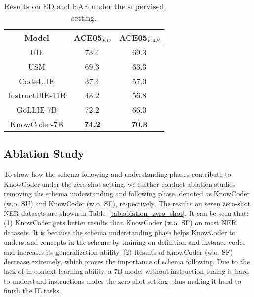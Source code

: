 \begin{table}
  \centering
  \resizebox{0.8\linewidth}{!}
  {
  \begin{tabular}{@{}c|cc}
  \toprule
  \textbf{Model}  & \textbf{ACE05$_{ED}$}         & \textbf{ACE05$_{EAE}$}    \\ 
  
  \midrule
  UIE                     &   73.4    &   69.3   \\
  USM                     &   69.3    &   63.3   \\ 
  \midrule
  Code4UIE                &   37.4    &   57.0   \\ 
  
  \midrule
  
  InstructUIE-11B             &   43.2    &   56.8   \\
  GoLLIE-7B                  &   72.2    &   66.0   \\ 
  
  \midrule
  KnowCoder-7B              &   \textbf{74.2}   &   \textbf{70.3}     \\
  \bottomrule
  \end{tabular}}
  \caption{Results on ED and EAE under the supervised setting.}
  \label{tab:ed-eae-supervised-results}
  \vspace{-4mm}
\end{table}

\subsection{Ablation Study}
To show how the schema following and understanding phases contribute to KnowCoder under the zero-shot setting, we further conduct ablation studies removing the schema understanding and following phase, denoted as KnowCoder (w.o. SU) and KnowCoder (w.o. SF), respectively. The results on seven zero-shot NER datasets are shown in Table~\ref{tab:ablation_zero_shot}. It can be seen that: (1) KnowCoder gets better results than KnowCoder (w.o. SF) on most NER datasets. It is because the schema understanding phase helps KnowCoder to understand concepts in the schema by training on definition and instance codes and increases its generalization ability. (2) Results of KnowCoder (w.o. SF) decrease extremely, which proves the importance of schema following. Due to the lack of in-context learning ability, a 7B model without instruction tuning is hard to understand instructions under the zero-shot setting, thus making it hard to finish the IE tasks. 

